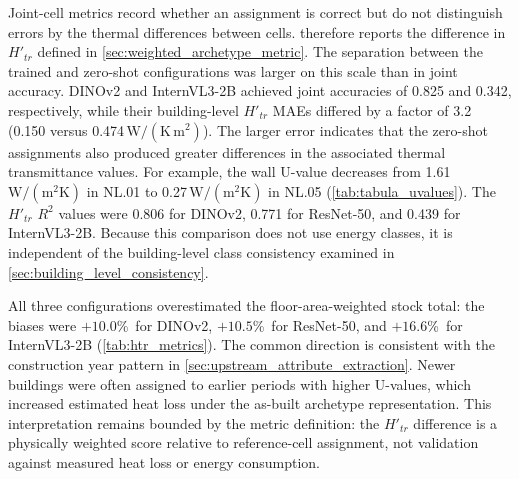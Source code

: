 Joint-cell metrics record whether an assignment is correct but do not distinguish errors by the thermal differences between cells.
 therefore reports the difference in $H'_{tr}$ defined in \cref{sec:weighted_archetype_metric}.
The separation between the trained and zero-shot configurations was larger on this scale than in joint accuracy.
DINOv2 and InternVL3-2B achieved joint accuracies of 0.825 and 0.342, respectively, while their building-level $H'_{tr}$ MAEs differed by a factor of 3.2 (0.150 versus 0.474\,$\mathrm{W/(K\,m^2)}$).
The larger error indicates that the zero-shot assignments also produced greater differences in the associated thermal transmittance values.
For example, the wall U-value decreases from 1.61\,$\mathrm{W/(m^2K)}$ in NL.01 to 0.27\,$\mathrm{W/(m^2K)}$ in NL.05 (\cref{tab:tabula_uvalues}).
The $H'_{tr}$ $R^2$ values were 0.806 for DINOv2, 0.771 for ResNet-50, and 0.439 for InternVL3-2B.
Because this comparison does not use energy classes, it is independent of the building-level class consistency examined in \cref{sec:building_level_consistency}.

All three configurations overestimated the floor-area-weighted stock total: the biases were $+10.0$\%~for DINOv2, $+10.5$\%~for ResNet-50, and $+16.6$\%~for InternVL3-2B (\cref{tab:htr_metrics}).
The common direction is consistent with the construction year pattern in \cref{sec:upstream_attribute_extraction}.
Newer buildings were often assigned to earlier periods with higher U-values, which increased estimated heat loss under the as-built archetype representation.
This interpretation remains bounded by the metric definition: the $H'_{tr}$ difference is a physically weighted score relative to reference-cell assignment, not validation against measured heat loss or energy consumption.

